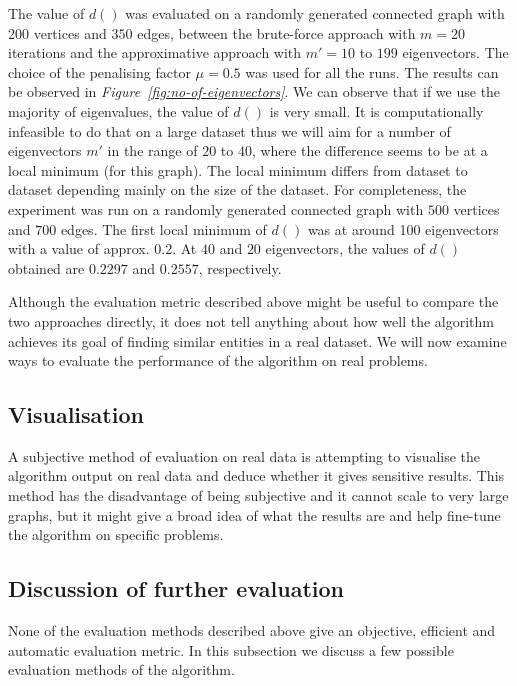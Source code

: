 \documentclass[12pt]{report}
\begin{document}
The value of $d()$ was evaluated on a randomly generated connected graph with $200$
vertices and $350$ edges, between the brute-force approach with $m=20$ iterations
and the approximative approach with $m' = 10$ to $199$ eigenvectors. The choice
of the penalising factor $\mu=0.5$ was used for all the runs. The results can be
observed in \emph{Figure~\ref{fig:no-of-eigenvectors}}. We can observe that if
we use the majority of eigenvalues, the value of $d()$ is very small. It is
computationally infeasible to do that on a large dataset thus we will aim for a
number of eigenvectors $m'$ in the range of $20$ to $40$, where the difference
seems to be at a local minimum (for this graph). The local minimum differs from
dataset to dataset depending mainly on the size of the dataset. For completeness,
the experiment was run on a randomly generated connected graph with $500$ vertices
and $700$ edges. The first local minimum of $d()$ was at around 100 eigenvectors
with a value of approx. $0.2$. At $40$ and $20$ eigenvectors, the values of $d()$
obtained are $0.2297$ and $0.2557$, respectively.


%
%
Although the evaluation metric described above might be useful to compare the two
approaches directly, it does not tell anything about how well the algorithm achieves
its goal of finding similar entities in a real dataset. We will now examine ways to
evaluate the performance of the algorithm on real problems.


%
\subsection{Visualisation}
%
A subjective method of evaluation on real data is attempting to visualise the
algorithm output on real data and deduce whether it gives sensitive results.
This method has the disadvantage of being subjective and it cannot scale to very
large graphs, but it might give a broad idea of what the results are and help
fine-tune the algorithm on specific problems.


%
\subsection{Discussion of further evaluation}
%
None of the evaluation methods described above give an objective, efficient and
automatic evaluation metric. In this subsection we discuss a few possible evaluation
methods of the algorithm.
\end{document}

